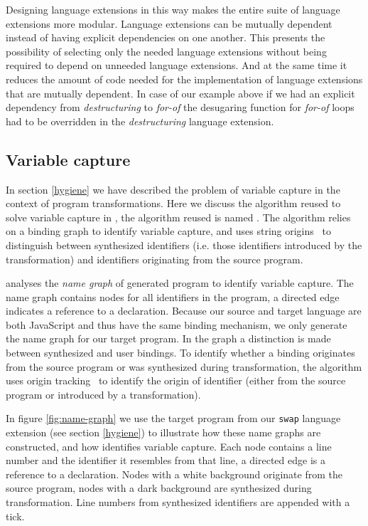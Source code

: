 Designing language extensions in this way makes the entire suite of language extensions more modular. Language extensions can be mutually dependent instead of having explicit dependencies on one another. This presents the possibility of selecting only the needed language extensions without being required to depend on unneeded language extensions. And at the same time it reduces the amount of code needed for the implementation of language extensions that are mutually dependent. In case of our example above if we had an explicit dependency from \textit{destructuring} to \textit{for-of} the desugaring function for \textit{for-of} loops had to be overridden in the \textit{destructuring} language extension.	

\subsection{Variable capture}
In section \ref{hygiene} we have described the problem of variable capture in the context of program transformations. 
Here we discuss the algorithm reused to solve variable capture in \projectname, the algorithm reused is named \textit{\vfix}. The algorithm relies on a binding graph to identify variable capture, and uses string origins~\cite{Inostroza2014} to distinguish between synthesized identifiers (i.e. those identifiers introduced by the transformation) and identifiers originating from the source program.

\textit{\vfix} analyses the \textit{name graph} of generated program to identify variable capture. The name graph contains nodes for all identifiers in the program, a directed edge indicates a reference to a declaration. Because our source and target language are both JavaScript and thus have the same binding mechanism, we only generate the name graph for our target program. In the graph a distinction is made between synthesized and user bindings. To identify whether a binding originates from the source program or was synthesized during transformation, the \textit{\vfix} algorithm uses origin tracking~\cite{Inostroza2014} to identify the origin of identifier (either from the source program or introduced by a transformation).

In figure \ref{fig:name-graph} we use the target program from our \lstinline$swap$ language extension (see section \ref{hygiene}) to illustrate how these name graphs are constructed, and how \textit{\vfix} identifies variable capture. Each node contains a line number and the identifier it resembles from that line, a directed edge is a reference to a declaration. Nodes with a white background originate from the source program, nodes with a dark background are synthesized during transformation. Line numbers from synthesized identifiers are appended with a tick.

